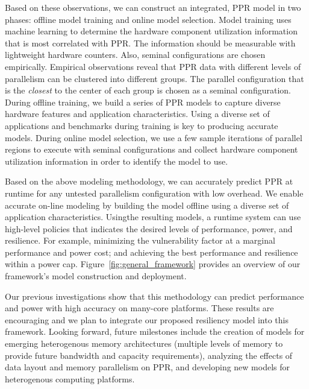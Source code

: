 \documentclass{article}  %
\begin{document}
Based on these observations, we can construct an integrated, PPR model 
in two phases: offline model training and online model selection. Model 
training uses machine learning to determine the hardware component 
utilization information that is most correlated with PPR. The information 
should be measurable with lightweight hardware counters. Also, seminal 
configurations are chosen empirically. Empirical observations reveal that 
PPR data with different levels of parallelism can be clustered into different 
groups. The parallel configuration that is the \emph{closest} to the center 
of each group is chosen as a seminal configuration. 
During offline training, we build a series of PPR models to capture diverse 
hardware features and application characteristics. Using a diverse set of 
applications and benchmarks during training is key to producing accurate 
models. During online model selection, we use a few sample iterations of
parallel regions to execute with seminal configurations and collect
hardware component utilization information in order to identify the model 
to use.

Based on the above modeling methodology, we can accurately predict PPR
at runtime for any untested parallelism configuration with low
overhead. We enable accurate on-line modeling by building the model offline 
using a diverse set of application characteristics. Usingthe resulting models,
a runtime system can use high-level policies that indicates the desired levels
of performance, power, and resilience. For example, minimizing the
vulnerability factor at a marginal performance and power cost; and
achieving the best performance and resilience within a power
cap. Figure~\ref{fig:general_framework} provides an overview of our 
framework's model construction and deployment.

Our previous investigations show that this methodology can
predict performance and power with high accuracy on many-core
platforms. These results are encouraging and we plan to integrate our
proposed resiliency model into this framework. Looking forward, future
milestones include the creation of models for emerging heterogenous
memory architectures (multiple levels of memory to provide future
bandwidth and capacity requirements), analyzing the effects of data
layout and memory parallelism on PPR, and developing new models for
heterogenous computing platforms.
\end{document}

